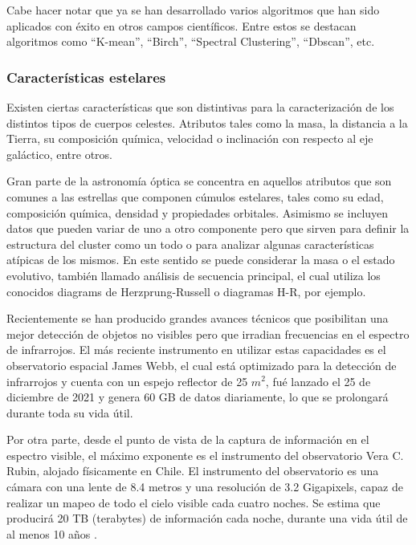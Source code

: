 \documentclass[
	11pt,oneside,a4paper,
	fleqn,
	article
]{memoir}
\begin{document}
Cabe hacer notar que ya se han desarrollado varios algoritmos que han sido aplicados con éxito en otros campos científicos. Entre estos se destacan algoritmos como “K-mean”, “Birch”, “Spectral Clustering”, “Dbscan”, etc.\cite{rodriguez2019clustering}

\subsubsection{Características estelares}

Existen ciertas características que son distintivas para la caracterización de los distintos tipos de cuerpos celestes. Atributos tales como la masa, la distancia a la Tierra, su composición química, velocidad o inclinación con respecto al eje galáctico, entre otros. 

Gran parte de la astronomía óptica se concentra en aquellos atributos que son comunes a las estrellas que componen cúmulos estelares, tales como su edad, composición química, densidad y propiedades orbitales. Asimismo se incluyen datos que pueden variar de uno a otro componente pero que sirven para definir la estructura del cluster como un todo o para analizar algunas características atípicas de los mismos. En este sentido se puede considerar la masa o el estado evolutivo, también llamado análisis de secuencia principal, el cual utiliza los conocidos diagrams de Herzprung-Russell o diagramas H-R, por ejemplo\cite{fall2012similarities,kalirai2010star}.

Recientemente se han producido grandes avances técnicos que posibilitan una mejor detección de objetos no visibles pero que irradian frecuencias en el espectro de infrarrojos. El más reciente instrumento en utilizar estas capacidades es el observatorio espacial James Webb, el cual está optimizado para la detección de infrarrojos y cuenta con un espejo reflector de 25 $m^2$, fué lanzado el 25 de diciembre de 2021 y genera 60 GB de datos diariamente, lo que se prolongará durante toda su vida útil\cite{gardner2006james}.

Por otra parte, desde el punto de vista de la captura de información en el espectro visible, el máximo exponente es el instrumento del observatorio Vera C. Rubin, alojado físicamente en Chile. El instrumento del observatorio es una cámara con una lente de 8.4 metros y una resolución de 3.2 Gigapixels, capaz de realizar un mapeo de todo el cielo visible cada cuatro noches. Se estima que producirá 20 TB (terabytes) de información cada noche, durante una vida útil de al menos 10 años \cite{Telescope2021Jul}.
\end{document}
